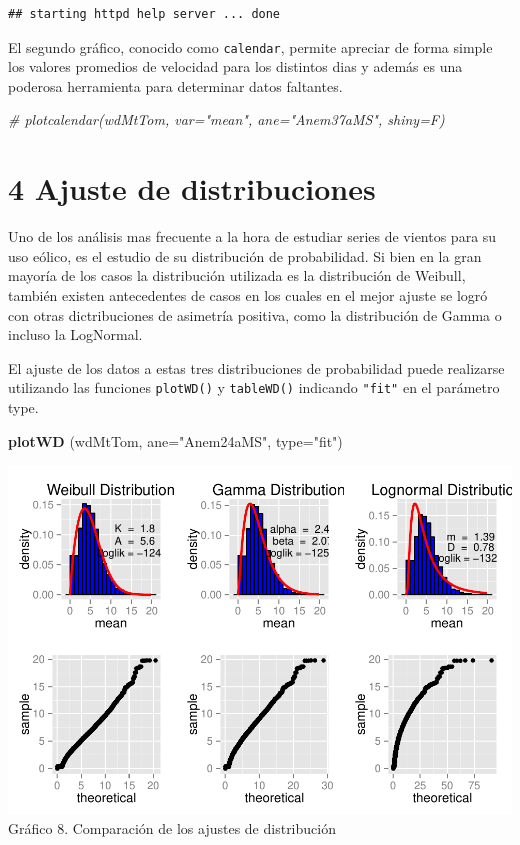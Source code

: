 \documentclass[]{article}
\newenvironment{Shaded}{\begin{snugshade}}{\end{snugshade}}
\newcommand{\KeywordTok}[1]{\textcolor[rgb]{0.13,0.29,0.53}{\textbf{{#1}}}}
\newcommand{\DataTypeTok}[1]{\textcolor[rgb]{0.13,0.29,0.53}{{#1}}}
\newcommand{\StringTok}[1]{\textcolor[rgb]{0.31,0.60,0.02}{{#1}}}
\newcommand{\CommentTok}[1]{\textcolor[rgb]{0.56,0.35,0.01}{\textit{{#1}}}}
\newcommand{\NormalTok}[1]{{#1}}
\begin{document}
\begin{verbatim}
## starting httpd help server ... done
\end{verbatim}

El segundo gráfico, conocido como \texttt{calendar}, permite apreciar de
forma simple los valores promedios de velocidad para los distintos dias
y además es una poderosa herramienta para determinar datos faltantes.

\begin{Shaded}
\begin{Highlighting}[]
\CommentTok{# plotcalendar(wdMtTom, var="mean", ane="Anem37aMS", shiny=F)}
\end{Highlighting}
\end{Shaded}

\section{4 Ajuste de distribuciones}\label{ajuste-de-distribuciones}

Uno de los análisis mas frecuente a la hora de estudiar series de
vientos para su uso eólico, es el estudio de su distribución de
probabilidad. Si bien en la gran mayoría de los casos la distribución
utilizada es la distribución de Weibull, también existen antecedentes de
casos en los cuales en el mejor ajuste se logró con otras dictribuciones
de asimetría positiva, como la distribución de Gamma o incluso la
LogNormal.

El ajuste de los datos a estas tres distribuciones de probabilidad puede
realizarse utilizando las funciones \texttt{plotWD()} y
\texttt{tableWD()} indicando \texttt{"fit"} en el parámetro type.

\begin{Shaded}
\begin{Highlighting}[]
\KeywordTok{plotWD} \NormalTok{(wdMtTom, }\DataTypeTok{ane=}\StringTok{"Anem24aMS"}\NormalTok{, }\DataTypeTok{type=}\StringTok{"fit"}\NormalTok{)}
\end{Highlighting}
\end{Shaded}

\includegraphics{Manual_WindResource_files/figure-latex/unnamed-chunk-22-1.pdf}
Gráfico 8. Comparación de los ajustes de distribución
\end{document}
